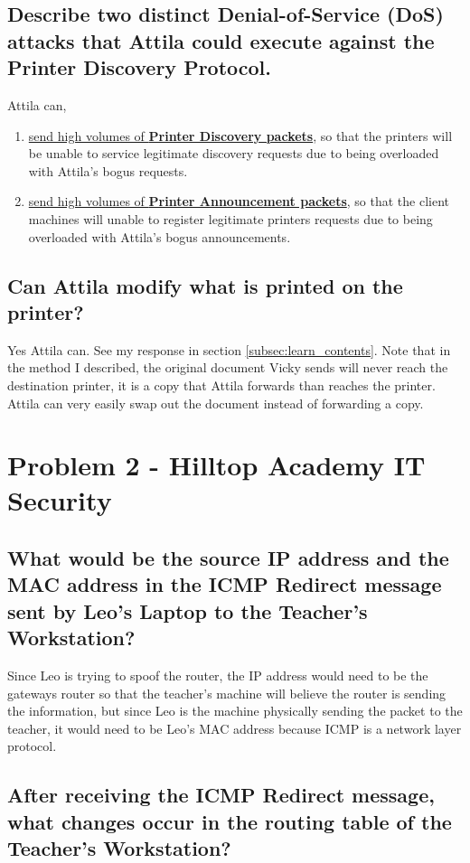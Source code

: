 \documentclass{article}
\begin{document}
\subsection{Describe two distinct Denial-of-Service (DoS) attacks that Attila could execute
against the Printer Discovery Protocol.}
	Attila can,
	\begin{enumerate}
		\item \underline{send high volumes of \textbf{Printer Discovery packets}}, so that the printers will be unable to service legitimate
		discovery requests due to being overloaded with Attila's bogus requests.
		\item \underline{send high volumes of \textbf{Printer Announcement packets}}, so that the client machines will unable to register legitimate 
		printers requests due to being overloaded with Attila's bogus announcements.
	\end{enumerate}

\subsection{Can Attila modify what is printed on the printer?}
	Yes Attila can. See my response in section \ref{subsec:learn_contents}. Note that in the method I described, the 
	original document Vicky sends will never reach the destination printer, it is a copy that Attila forwards than reaches the printer.
	Attila can very easily swap out the document instead of forwarding a copy.

\section{Problem 2 - Hilltop Academy IT Security}
\label{sec:hilltop}

\subsection{What would be the source IP address and the MAC address in the ICMP
Redirect message sent by Leo’s Laptop to the Teacher’s Workstation?}
	Since Leo is trying to spoof the router, the IP address would need to be the gateways router so that the teacher's
	machine will believe the router is sending the information, but since Leo is the machine physically 
	sending the packet to the teacher, it would need to be Leo's MAC address because ICMP is a network layer protocol.

\subsection{After receiving the ICMP Redirect message, what changes occur in the routing
table of the Teacher’s Workstation?}
\end{document}
